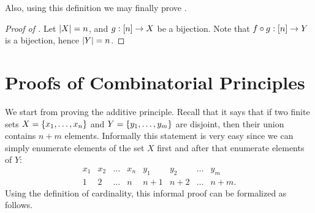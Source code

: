 Also, using this definition we may finally prove
.
\begin{proof}[Proof of ]
    Let $\left|{X}\right| = n$, and $g : {[{n}]} \to X$ be a bijection.
    Note that $f \circ g : {[{n}]} \to Y$ is a bijection, hence
    $\left|{Y}\right| = n$.
\end{proof}

\section{Proofs of Combinatorial Principles}
We start from proving the additive principle. Recall that it says that if two
finite sets $X = \set{x_1, \dots, x_n}$ and $Y = \set{y_1, \dots, y_m}$ are
disjoint, then their union contains $n + m$ elements. Informally this statement
is very easy since we can simply enumerate elements of the set $X$ first and
after that enumerate elements of $Y$:
\[
  \begin{matrix}
    x_1 & x_2 & \dots & x_n & y_1    & y_2   & \dots & y_m \\
    1   & 2   & \dots & n   & n + 1  & n + 2 & \dots & n + m.
  \end{matrix}
\]
Using the definition of cardinality, this informal proof can be formalized as
follows. 
